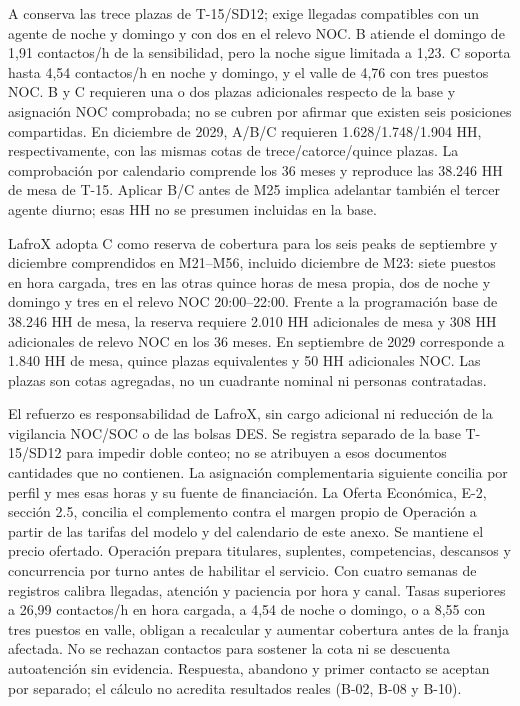 A conserva las trece plazas de T-15/SD12; exige llegadas compatibles con un agente de noche y domingo y con dos en el relevo NOC. B atiende el domingo de 1,91 contactos/h de la sensibilidad, pero la noche sigue limitada a 1,23. C soporta hasta 4,54 contactos/h en noche y domingo, y el valle de 4,76 con tres puestos NOC. B y C requieren una o dos plazas adicionales respecto de la base y asignación NOC comprobada; no se cubren por afirmar que existen seis posiciones compartidas. En diciembre de 2029, A/B/C requieren 1.628/1.748/1.904 HH, respectivamente, con las mismas cotas de trece/catorce/quince plazas. La comprobación por calendario comprende los 36 meses y reproduce las 38.246 HH de mesa de T-15. Aplicar B/C antes de M25 implica adelantar también el tercer agente diurno; esas HH no se presumen incluidas en la base.

LafroX adopta C como reserva de cobertura para los seis peaks de septiembre y diciembre comprendidos en M21--M56, incluido diciembre de M23: siete puestos en hora cargada, tres en las otras quince horas de mesa propia, dos de noche y domingo y tres en el relevo NOC 20:00--22:00. Frente a la programación base de 38.246 HH de mesa, la reserva requiere 2.010 HH adicionales de mesa y 308 HH adicionales de relevo NOC en los 36 meses. En septiembre de 2029 corresponde a 1.840 HH de mesa, quince plazas equivalentes y 50 HH adicionales NOC. Las plazas son cotas agregadas, no un cuadrante nominal ni personas contratadas.

El refuerzo es responsabilidad de LafroX, sin cargo adicional ni reducción de la vigilancia NOC/SOC o de las bolsas DES. Se registra separado de la base T-15/SD12 para impedir doble conteo; no se atribuyen a esos documentos cantidades que no contienen. La asignación complementaria siguiente concilia por perfil y mes esas horas y su fuente de financiación. La Oferta Económica, E-2, sección 2.5, concilia el complemento contra el margen propio de Operación a partir de las tarifas del modelo y del calendario de este anexo. Se mantiene el precio ofertado. Operación prepara titulares, suplentes, competencias, descansos y concurrencia por turno antes de habilitar el servicio. Con cuatro semanas de registros calibra llegadas, atención y paciencia por hora y canal. Tasas superiores a 26,99 contactos/h en hora cargada, a 4,54 de noche o domingo, o a 8,55 con tres puestos en valle, obligan a recalcular y aumentar cobertura antes de la franja afectada. No se rechazan contactos para sostener la cota ni se descuenta autoatención sin evidencia. Respuesta, abandono y primer contacto se aceptan por separado; el cálculo no acredita resultados reales (B-02, B-08 y B-10).

